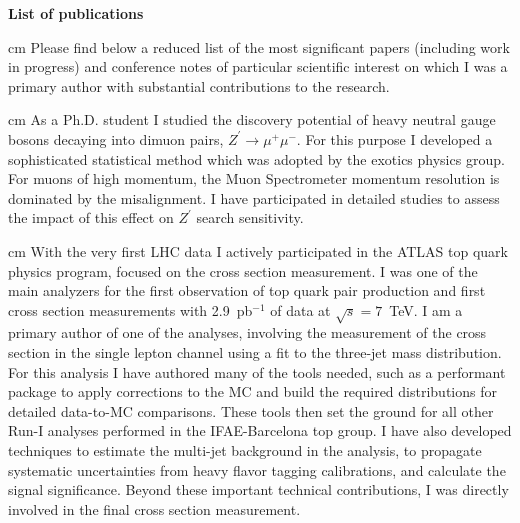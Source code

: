 \documentclass[12pt]{article}
\begin{document}
\pagestyle{fancy}
\fancyhf{}


\begin{center}
{\bf \Large List of publications} \\
\end{center}

 cm
\noindent 
Please find below a reduced list of the most significant papers (including work in progress) and conference notes of particular scientific interest on which I was a primary author with substantial contributions to the research. 

 cm
\noindent {\bf \color{red} [1]}  As a Ph.D. student I studied the discovery potential of heavy neutral gauge bosons decaying into dimuon pairs, $Z^{\prime} \rightarrow \mu^{+}\mu^{-}$. 
For this purpose I developed a sophisticated statistical method which was adopted by the exotics physics group. For muons of high momentum, 
the Muon Spectrometer momentum resolution is dominated by the misalignment. I have participated in detailed studies to assess the impact of this effect on $Z^{\prime}$ 
search sensitivity.

 cm
\noindent {\bf \color{red} [2]} With the very first LHC data I actively participated in the ATLAS top quark physics program, focused on the cross section measurement. I was one of the main analyzers for the first observation of top quark pair production and first cross section measurements with 2.9~pb$^{-1}$ of data at $\sqrt{s}=7$~TeV. I am a primary author of one of the analyses, involving the measurement of the cross section in the single lepton channel using a fit to the three-jet mass distribution. For this analysis I have authored many of the tools needed, such as a performant package to apply corrections to the MC and build the required distributions for detailed data-to-MC comparisons. These tools then set the ground for all other Run-I analyses performed in the IFAE-Barcelona top group. I have also developed techniques to estimate the multi-jet background in the analysis, to propagate systematic uncertainties from heavy flavor tagging calibrations, and calculate the signal significance. Beyond these important technical contributions, I was directly involved in the final cross section measurement.
\end{document}
